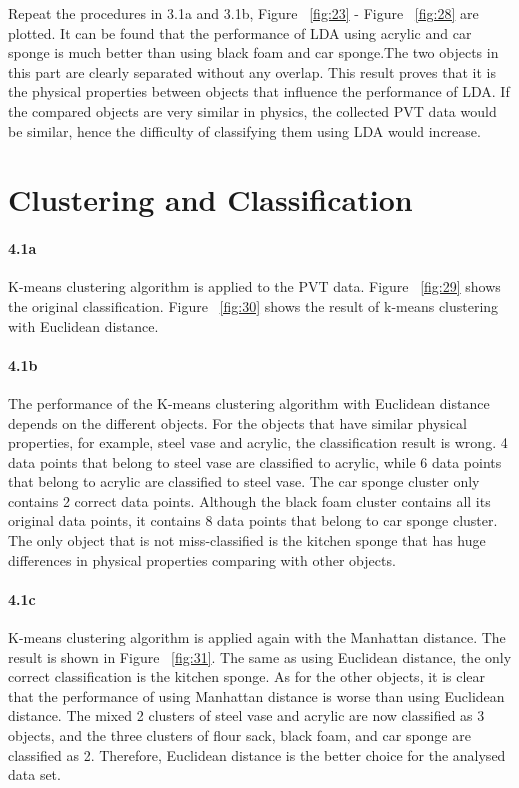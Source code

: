 \documentclass[10pt,twocolumn,letterpaper]{article}
\begin{document}
\noindent Repeat the procedures in 3.1a and 3.1b, Figure ~\ref{fig:23} - Figure ~\ref{fig:28} are plotted. It can be found that the performance of LDA using acrylic and car sponge is much better than using black foam and car sponge.The two objects in this part are clearly separated without any overlap. This result proves that it is the physical properties between objects that influence the performance of LDA. If the compared objects are very similar in physics, the collected PVT data would be similar, hence the difficulty of classifying them using LDA would increase.



\section{Clustering and Classification}

\paragraph{4.1a}
K-means clustering algorithm is applied to the PVT data. Figure ~\ref{fig:29} shows the original classification. Figure ~\ref{fig:30} shows the result of k-means clustering with Euclidean distance.

\paragraph{4.1b}
The performance of the K-means clustering algorithm with Euclidean distance depends on the different objects. For the objects that have similar physical properties, for example, steel vase and acrylic, the classification result is wrong. 4 data points that belong to steel vase are classified to acrylic, while 6 data points that belong to acrylic are classified to steel vase. The car sponge cluster only contains 2 correct data points. Although the black foam cluster contains all its original data points, it contains 8 data points that belong to car sponge cluster. The only object that is not miss-classified is the kitchen sponge that has huge differences in physical properties comparing with other objects.


\paragraph{4.1c}
K-means clustering algorithm is applied again with the Manhattan distance. The result is shown in Figure ~\ref{fig:31}. The same as using Euclidean distance, the only correct classification is the kitchen sponge. As for the other objects, it is clear that the performance of using Manhattan distance is worse than using Euclidean distance. The mixed 2 clusters of steel vase and acrylic are now classified as 3 objects, and the three clusters of flour sack, black foam, and car sponge are classified as 2. Therefore, Euclidean distance is the better choice for the analysed data set.
\end{document}

